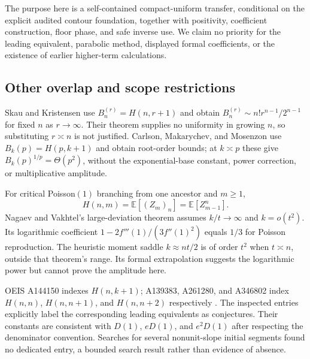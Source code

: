 \documentclass[11pt,letterpaper]{article}
\theoremstyle{remark}\newtheorem{remark}[theorem]{Remark}
\begin{document}
The purpose here is a self-contained compact-uniform transfer, conditional on the explicit audited contour foundation, together with positivity, coefficient construction, floor phase, and safe inverse use. We claim no priority for the leading equivalent, parabolic method, displayed formal coefficients, or the existence of earlier higher-term calculations.

\subsection{Other overlap and scope restrictions}
Skau and Kristensen \cite{skau} use $B_n^{(r)}=H(n,r+1)$ and obtain
$B_n^{(r)}\sim n!r^{n-1}/2^{n-1}$ for fixed $n$ as $r\to\infty$. Their theorem supplies no uniformity in growing $n$, so substituting $r\asymp n$ is not justified. Carlson, Makarychev, and Mosenzon \cite[Theorem 5.7]{cmm} use $B_k(p)=H(p,k+1)$ and obtain root-order bounds; at $k\asymp p$ these give $B_k(p)^{1/p}=\Theta(p^2)$, without the exponential-base constant, power correction, or multiplicative amplitude.

For critical Poisson$(1)$ branching from one ancestor and $m\geq1$,
\[
 H(n,m)=\mathbb E[(Z_m)_n]=\mathbb E[Z_{m-1}^{n}].
\]
Nagaev and Vakhtel's large-deviation theorem \cite{nv} assumes $k/t\to\infty$ and $k=o(t^2)$. Its logarithmic coefficient $1-2f'''(1)/(3f''(1)^2)$ equals $1/3$ for Poisson reproduction. The heuristic moment saddle $k\approx nt/2$ is of order $t^2$ when $t\asymp n$, outside that theorem's range. Its formal extrapolation suggests the logarithmic power but cannot prove the amplitude here.

OEIS A144150 indexes $H(n,k+1)$; A139383, A261280, and A346802 index $H(n,n)$, $H(n,n+1)$, and $H(n,n+2)$ respectively \cite{oeis}. The inspected entries explicitly label the corresponding leading equivalents as conjectures. Their constants are consistent with $D(1)$, $eD(1)$, and $e^2D(1)$ after respecting the denominator convention. Searches for several nonunit-slope initial segments found no dedicated entry, a bounded search result rather than evidence of absence.
\end{document}
